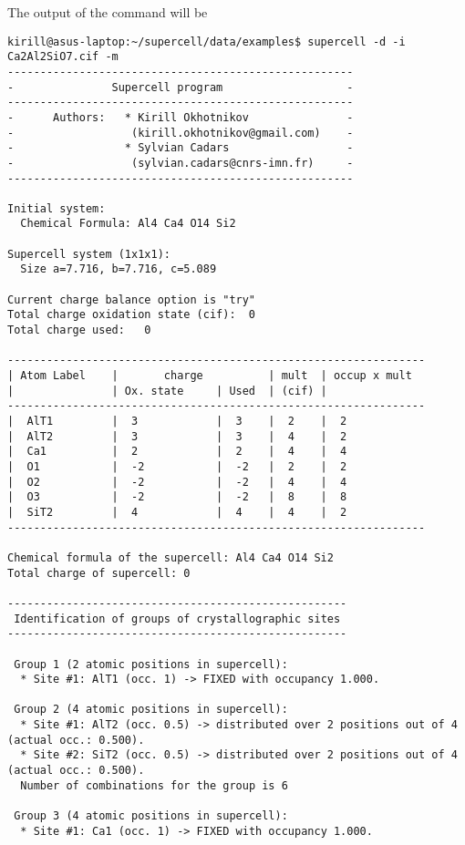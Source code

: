 \documentclass[a4paper,10pt]{article}
\begin{document}
The output of the command will be
\begin{verbatim}
kirill@asus-laptop:~/supercell/data/examples$ supercell -d -i Ca2Al2SiO7.cif -m 
-----------------------------------------------------
-               Supercell program                   -
-----------------------------------------------------
-      Authors:   * Kirill Okhotnikov               -
-                  (kirill.okhotnikov@gmail.com)    -
-                 * Sylvian Cadars                  -
-                  (sylvian.cadars@cnrs-imn.fr)     -
-----------------------------------------------------

Initial system:
  Chemical Formula: Al4 Ca4 O14 Si2

Supercell system (1x1x1):
  Size a=7.716, b=7.716, c=5.089

Current charge balance option is "try"
Total charge oxidation state (cif):  0
Total charge used:   0

----------------------------------------------------------------
| Atom Label    |       charge          | mult  | occup x mult
|               | Ox. state     | Used  | (cif) |                
----------------------------------------------------------------
|  AlT1         |  3            |  3    |  2    |  2
|  AlT2         |  3            |  3    |  4    |  2
|  Ca1          |  2            |  2    |  4    |  4
|  O1           |  -2           |  -2   |  2    |  2
|  O2           |  -2           |  -2   |  4    |  4
|  O3           |  -2           |  -2   |  8    |  8
|  SiT2         |  4            |  4    |  4    |  2
----------------------------------------------------------------

Chemical formula of the supercell: Al4 Ca4 O14 Si2
Total charge of supercell: 0

----------------------------------------------------
 Identification of groups of crystallographic sites 
----------------------------------------------------

 Group 1 (2 atomic positions in supercell):
  * Site #1: AlT1 (occ. 1) -> FIXED with occupancy 1.000.

 Group 2 (4 atomic positions in supercell):
  * Site #1: AlT2 (occ. 0.5) -> distributed over 2 positions out of 4 (actual occ.: 0.500).
  * Site #2: SiT2 (occ. 0.5) -> distributed over 2 positions out of 4 (actual occ.: 0.500).
  Number of combinations for the group is 6

 Group 3 (4 atomic positions in supercell):
  * Site #1: Ca1 (occ. 1) -> FIXED with occupancy 1.000.


\end{verbatim}
\end{document}
